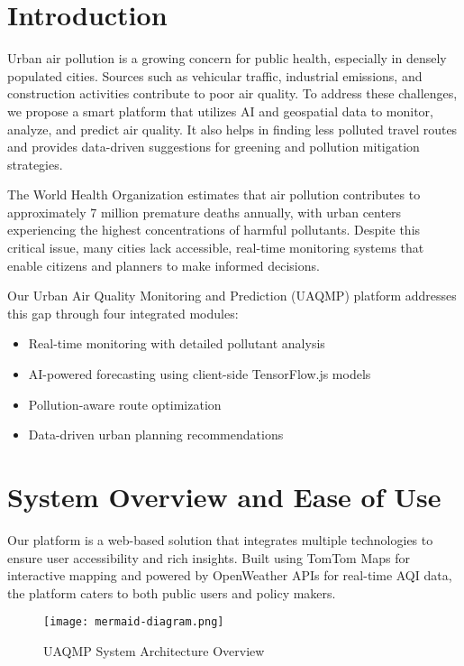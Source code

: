 \documentclass[conference]{IEEEtran}
\begin{document}
\section{Introduction}
Urban air pollution is a growing concern for public health, especially in densely populated cities. Sources such as vehicular traffic, industrial emissions, and construction activities contribute to poor air quality. To address these challenges, we propose a smart platform that utilizes AI and geospatial data to monitor, analyze, and predict air quality. It also helps in finding less polluted travel routes and provides data-driven suggestions for greening and pollution mitigation strategies.

The World Health Organization estimates that air pollution contributes to approximately 7 million premature deaths annually, with urban centers experiencing the highest concentrations of harmful pollutants. Despite this critical issue, many cities lack accessible, real-time monitoring systems that enable citizens and planners to make informed decisions.

Our Urban Air Quality Monitoring and Prediction (UAQMP) platform addresses this gap through four integrated modules:
\begin{itemize}
    \item Real-time monitoring with detailed pollutant analysis
    \item AI-powered forecasting using client-side TensorFlow.js models
    \item Pollution-aware route optimization
    \item Data-driven urban planning recommendations
\end{itemize}

\section{System Overview and Ease of Use}
Our platform is a web-based solution that integrates multiple technologies to ensure user accessibility and rich insights. Built using TomTom Maps for interactive mapping and powered by OpenWeather APIs for real-time AQI data, the platform caters to both public users and policy makers. 

\begin{figure}[htbp]
    \centering
    \texttt{[image: mermaid-diagram.png]}
    \caption{UAQMP System Architecture Overview}
    \label{fig:system-architecture}
\end{figure}
\end{document}
